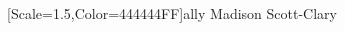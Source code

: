 \documentclass[11pt]{memoir}
\begin{document}
  \frontmatter

  

  \pagestyle{plain}

  \doublespacing

  \null
  \vfill
  \begin{flushright}
    {[Scale=1.5,Color=444444FF]\Huge ally}
    \vfill
    {\Huge Madison Scott-Clary}
  \end{flushright}
  \thispagestyle{empty}

  \newpage

  

  \tableofcontents*
  \newpage
  \null
  \cleardoublepage

  \onehalfspacing


  \mainmatter

  \pagestyle{ourbook}
  \twosided


  \begin{paracol}{2}
  \begin{leftcolumn}
  
  
  
  
  
  
  
  
  
  \end{leftcolumn}
  \end{paracol}

  \begin{paracol}{2}
  \begin{leftcolumn}
  
  \end{leftcolumn}
  \end{paracol}

  \begin{paracol}{2}
  \begin{leftcolumn}
  
  \end{leftcolumn}
  \end{paracol}

  \begin{paracol}{2}
  \begin{leftcolumn}
  
  \end{leftcolumn}
  \end{paracol}
\end{document}
